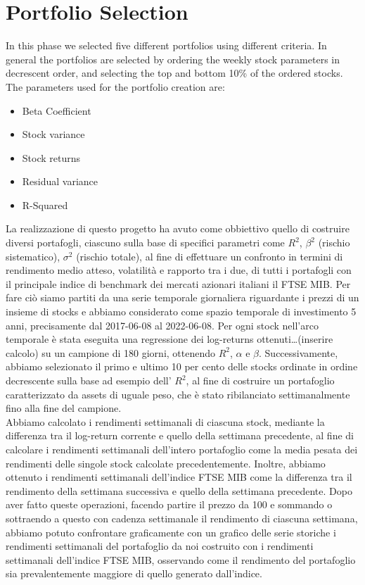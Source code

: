 \documentclass[fleqn,usenatbib]{mnras}
\begin{document}
\section{Portfolio Selection}
In this phase we selected five different portfolios using different criteria. In general the portfolios are selected by ordering the weekly stock parameters in decrescent order, and selecting the top and bottom 10\% of the ordered stocks.
The parameters used for the portfolio creation are:
\begin{itemize}
	\item Beta Coefficient
	\item Stock variance
	\item Stock returns
	\item Residual variance
	\item R-Squared
\end{itemize}

La realizzazione di questo progetto ha avuto come obbiettivo quello di costruire diversi portafogli, ciascuno sulla base di specifici parametri come $R^2$, $\beta^2$ (rischio sistematico), $\sigma^2$ (rischio totale), al fine di effettuare un confronto in termini di rendimento medio atteso, volatilità e rapporto tra i due, di tutti i portafogli con il principale indice di benchmark dei mercati azionari italiani il FTSE MIB. Per fare ciò siamo partiti da una serie temporale giornaliera riguardante i prezzi di un insieme di stocks e abbiamo considerato come spazio temporale di investimento 5 anni, precisamente dal 2017-06-08 al 2022-06-08. Per ogni stock nell'arco temporale è stata eseguita una regressione dei log-returns ottenuti…(inserire calcolo) su un campione di 180 giorni, ottenendo $R^2$, $\alpha$ e $\beta$. Successivamente, abbiamo selezionato il primo e ultimo 10 per cento delle stocks ordinate in ordine decrescente sulla base ad esempio dell' $R^2$, al fine di costruire un portafoglio caratterizzato da assets di uguale peso, che è stato ribilanciato settimanalmente fino alla fine del campione.
\\Abbiamo calcolato i rendimenti settimanali di ciascuna stock, mediante la differenza tra il log-return corrente e quello della settimana precedente, al fine di calcolare i rendimenti settimanali dell'intero portafoglio come la media pesata dei rendimenti delle singole stock calcolate precedentemente. Inoltre, abbiamo ottenuto i rendimenti settimanali dell'indice FTSE MIB come la differenza tra il rendimento della settimana successiva e quello della settimana precedente. 
Dopo aver fatto queste operazioni, facendo partire il prezzo  da 100 e sommando o sottraendo a questo con cadenza settimanale il rendimento di ciascuna settimana, abbiamo potuto confrontare graficamente con un grafico delle serie storiche i rendimenti settimanali del portafoglio da noi costruito con i rendimenti settimanali dell'indice FTSE MIB, osservando come il rendimento del portafoglio sia prevalentemente maggiore di quello generato dall’indice.
\end{document}
